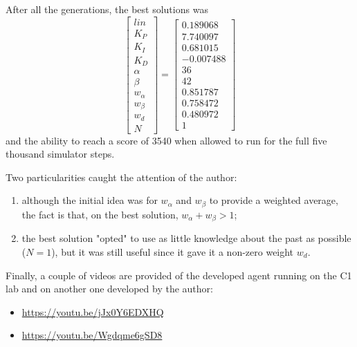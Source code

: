 \documentclass[runningheads]{llncs}
\begin{document}
After all the generations, the best solutions was
%
\begin{equation*}
    \begin{bmatrix}
        lin \\
        K_P \\
        K_I \\
        K_D \\
        \alpha \\
        \beta \\
        w_\alpha \\
        w_\beta \\
        w_d \\
        N
    \end{bmatrix}
    =
    \begin{bmatrix}
        0.189068 \\
        7.740097 \\
        0.681015 \\
        -0.007488 \\
        36 \\
        42 \\
        0.851787 \\
        0.758472 \\
        0.480972 \\
        1
    \end{bmatrix}
\end{equation*}
%
and the ability to reach a score of 3540 when allowed to run for the full five thousand simulator steps.

Two particularities caught the attention of the author:
%
\begin{enumerate}
    \item although the initial idea was for $w_\alpha$ and $w_\beta$ to provide a weighted average, the fact is that, on the best solution, $w_\alpha+w_\beta>1$;
    \item the best solution "opted" to use as little knowledge about the past as possible ($N=1$), but it was still useful since it gave it a non-zero weight $w_d$.
\end{enumerate}




Finally, a couple of videos are provided of the developed agent running on the C1 lab and on another one developed by the author:
%
\begin{itemize}
    \item \url{https://youtu.be/jJx0Y6EDXHQ}
    \item \url{https://youtu.be/Wgdqme6gSD8}
\end{itemize}
\end{document}
